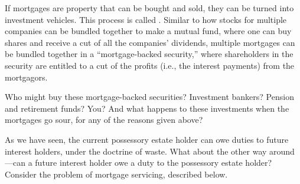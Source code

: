 
\item If mortgages are property that can be bought and sold, they can be turned
into investment vehicles. This
process is called
. Similar to how
stocks for multiple companies can be bundled together to make a mutual
fund, where one can buy shares and receive a cut of all the companies'
dividends, multiple mortgages can be bundled together in a ``mortgage-backed
security,'' where shareholders in the security are entitled to a cut of the
profits (i.e., the interest payments) from the
mortgagors.

Who might buy these mortgage-backed securities? Investment bankers? Pension and
retirement funds? You? And what happens to these investments when the mortgages
go sour, for any of the reasons given above?


\item As we have seen, the current possessory estate holder can owe duties to
future interest holders, under the doctrine of waste. What about the other way
around---can a future interest holder owe a duty to the possessory estate
holder? Consider the problem of mortgage servicing, described below.



